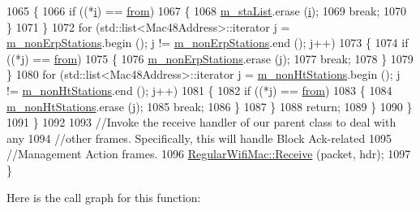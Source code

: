 \begin{DoxyCode}
1065                 \{
1066                   \textcolor{keywordflow}{if} ((*\hyperlink{bernuolliDistribution_8m_a6f6ccfcf58b31cb6412107d9d5281426}{i}) == \hyperlink{lte__amc_8m_a1b4c81ff74eb1a626b5ade44c81004b3}{from})
1067                     \{
1068                       \hyperlink{classns3_1_1ApWifiMac_a2a483f2002457f12a9e53e4b227cf1e8}{m\_staList}.erase (\hyperlink{bernuolliDistribution_8m_a6f6ccfcf58b31cb6412107d9d5281426}{i});
1069                       \textcolor{keywordflow}{break};
1070                     \}
1071                 \}
1072               \textcolor{keywordflow}{for} (std::list<Mac48Address>::iterator j = \hyperlink{classns3_1_1ApWifiMac_a0f928a5ab62fc090a939a26ac3675caf}{m\_nonErpStations}.begin (); j != 
      \hyperlink{classns3_1_1ApWifiMac_a0f928a5ab62fc090a939a26ac3675caf}{m\_nonErpStations}.end (); j++)
1073                 \{
1074                   \textcolor{keywordflow}{if} ((*j) == \hyperlink{lte__amc_8m_a1b4c81ff74eb1a626b5ade44c81004b3}{from})
1075                     \{
1076                       \hyperlink{classns3_1_1ApWifiMac_a0f928a5ab62fc090a939a26ac3675caf}{m\_nonErpStations}.erase (j);
1077                       \textcolor{keywordflow}{break};
1078                     \}
1079                 \}
1080               \textcolor{keywordflow}{for} (std::list<Mac48Address>::iterator j = \hyperlink{classns3_1_1ApWifiMac_a148d1aa2c429b0530603c797775fa5da}{m\_nonHtStations}.begin (); j != 
      \hyperlink{classns3_1_1ApWifiMac_a148d1aa2c429b0530603c797775fa5da}{m\_nonHtStations}.end (); j++)
1081                 \{
1082                   \textcolor{keywordflow}{if} ((*j) == \hyperlink{lte__amc_8m_a1b4c81ff74eb1a626b5ade44c81004b3}{from})
1083                     \{
1084                       \hyperlink{classns3_1_1ApWifiMac_a148d1aa2c429b0530603c797775fa5da}{m\_nonHtStations}.erase (j);
1085                       \textcolor{keywordflow}{break};
1086                     \}
1087                 \}
1088               \textcolor{keywordflow}{return};
1089             \}
1090         \}
1091     \}
1092 
1093   \textcolor{comment}{//Invoke the receive handler of our parent class to deal with any}
1094   \textcolor{comment}{//other frames. Specifically, this will handle Block Ack-related}
1095   \textcolor{comment}{//Management Action frames.}
1096   \hyperlink{classns3_1_1RegularWifiMac_a9abbbcea65b6dc416ab1b44785c40e9f}{RegularWifiMac::Receive} (packet, hdr);
1097 \}
\end{DoxyCode}


Here is the call graph for this function\+:



